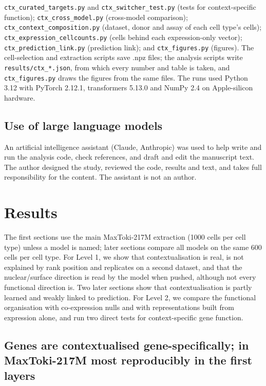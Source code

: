 \documentclass[
  11pt,
]{article}
\begin{document}
\texttt{ctx\_curated\_targets.py} and \texttt{ctx\_switcher\_test.py}
(tests for context-specific function); \texttt{ctx\_cross\_model.py}
(cross-model comparison); \texttt{ctx\_context\_composition.py}
(dataset, donor and assay of each cell type's cells);
\texttt{ctx\_expression\_cellcounts.py} (cells behind each
expression-only vector); \texttt{ctx\_prediction\_link.py} (prediction
link); and \texttt{ctx\_figures.py} (figures). The cell-selection and
extraction scripts save .npz files; the analysis scripts write
\texttt{results/ctx\_*.json}, from which every number and table is
taken, and \texttt{ctx\_figures.py} draws the figures from the same
files. The runs used Python 3.12 with PyTorch 2.12.1, transformers
5.13.0 and NumPy 2.4 on Apple-silicon hardware.

\subsection{Use of large language
models}\label{use-of-large-language-models}

An artificial intelligence assistant (Claude, Anthropic) was used to
help write and run the analysis code, check references, and draft and
edit the manuscript text. The author designed the study, reviewed the
code, results and text, and takes full responsibility for the content.
The assistant is not an author.

\section{Results}\label{results}

The first sections use the main MaxToki-217M extraction (1000 cells per
cell type) unless a model is named; later sections compare all models on
the same 600 cells per cell type. For Level 1, we show that
contextualisation is real, is not explained by rank position and
replicates on a second dataset, and that the nuclear/surface direction
is read by the model when pushed, although not every functional
direction is. Two later sections show that contextualisation is partly
learned and weakly linked to prediction. For Level 2, we compare the
functional organisation with co-expression nulls and with
representations built from expression alone, and run two direct tests
for context-specific gene function.

\subsection{Genes are contextualised gene-specifically; in MaxToki-217M
most reproducibly in the first
layers}\label{genes-are-contextualised-gene-specifically-in-maxtoki-217m-most-reproducibly-in-the-first-layers}
\end{document}
